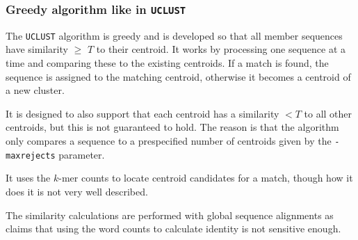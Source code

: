\subsubsection{Greedy algorithm like in \texttt{UCLUST}}
The \texttt{UCLUST} algorithm is greedy and is developed so that all member
sequences have similarity $\geq$ $T$ to their centroid.  It works by processing
one sequence at a time and comparing these to the existing centroids. If a
match is found, the sequence is assigned to the matching centroid, otherwise it
becomes a centroid of a new cluster.

It is designed to also support that each centroid has a similarity $<T$ to all
other centroids, but this is not guaranteed to hold. The reason is that the
algorithm only compares a sequence to a prespecified number of centroids given
by the \texttt{-maxrejects} parameter.

It uses the $k$-mer counts to locate centroid candidates for a match, though
how it does it is not very well described.

The similarity calculations are performed with global sequence alignments as
\cite{usearch} claims that using the word counts to calculate identity is not
sensitive enough.


